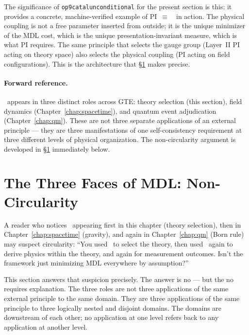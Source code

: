 \documentclass[11pt,openany]{book}
\theoremstyle{remark}
\newcommand{\MDL}{\text{MDL}}
\newcommand{\lean}[1]{%
  \penalty-100
  \begingroup\def\_{\textunderscore\allowbreak}\texttt{#1}\endgroup}
\begin{document}
The significance of \lean{op9\_catal\_unconditional} for the present section is this:
it provides a concrete, machine-verified example of PI~$\equiv$~\MDL\ in action. The
physical coupling is not a free parameter inserted from outside; it is the unique
minimizer of the MDL cost, which is the unique presentation-invariant measure, which
is what PI requires. The same principle that selects the gauge group (Layer~II PI
acting on theory space) also selects the physical coupling (PI acting on field
configurations). This is the architecture that \S\ref{sec:mdl_three_faces} makes
precise.

\paragraph{Forward reference.}
\MDL\ appears in three distinct roles across GTE: theory selection (this section),
field dynamics (Chapter~\ref{chap:spacetime}), and quantum event adjudication
(Chapter~\ref{chap:qm}). These are not three separate applications of an external
principle --- they are three manifestations of one self-consistency requirement at
three different levels of physical organization. The non-circularity argument is
developed in \S\ref{sec:mdl_three_faces} immediately below.

\FloatBarrier

\section{The Three Faces of MDL: Non-Circularity}
\label{sec:mdl_three_faces}

A reader who notices \MDL\ appearing first in this chapter (theory selection), then in
Chapter~\ref{chap:spacetime} (gravity), and again in Chapter~\ref{chap:qm}
(Born rule) may suspect circularity: ``You used \MDL\ to select the theory, then used
\MDL\ again to derive physics within the theory, and again for measurement outcomes.
Isn't the framework just minimizing MDL everywhere by assumption?''

This section answers that suspicion precisely. The answer is no --- but the no
requires explanation. The three roles are not three applications of the same external
principle to the same domain. They are three applications of the same principle to
three logically nested and disjoint domains. The domains are downstream of each other;
no application at one level refers back to any application at another level.
\end{document}
